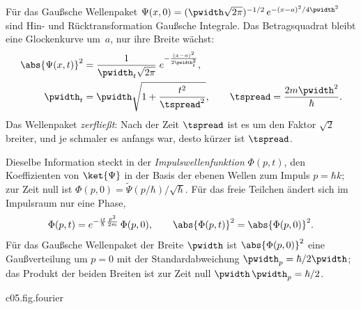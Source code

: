 Für das Gaußsche Wellenpaket
$\Psi(x,0) = (\pwidth\sqrt{2\pi})^{-1/2}\, e^{-(x-a)^2/4\pwidth^2}$ sind Hin- und
Rücktransformation Gaußsche Integrale. Das Betragsquadrat bleibt eine Glockenkurve um~$a$,
nur ihre Breite wächst:
\begin{align}
  \abs{\Psi(x,t)}^2 &= \frac{1}{\pwidth_t\sqrt{2\pi}}\;
  e^{-\frac{(x-a)^2}{2\pwidth_t^2}}, \label{c05.eq.zerfliessen}\\
  \pwidth_t &= \pwidth\sqrt{1+\frac{t^2}{\tspread^2}},
  \qquad
  \tspread = \frac{2m\pwidth^2}{\hbar}. \notag
\end{align}
Das Wellenpaket \emph{zerfließt}: Nach der Zeit $\tspread$ ist es um den Faktor $\sqrt{2}$
breiter, und je schmaler es anfangs war, desto kürzer ist $\tspread$.

Dieselbe Information steckt in der \emph{Impulswellenfunktion} $\Phi(p,t)$, den
Koeffizienten von $\ket{\Psi}$ in der Basis der ebenen Wellen zum Impuls $p = \hbar k$; zur
Zeit null ist $\Phi(p,0) = \widetilde{\Psi}(p/\hbar)/\sqrt{\hbar}$. Für das freie Teilchen ändert sich im
Impulsraum nur eine Phase,
\begin{equation}\label{c05.eq.impulszeit}
  \Phi(p,t) = e^{-\frac{it}{\hbar}\frac{p^2}{2m}}\,\Phi(p,0),
  \qquad
  \abs{\Phi(p,t)}^2 = \abs{\Phi(p,0)}^2 .
\end{equation}
Für das Gaußsche Wellenpaket der Breite $\pwidth$ ist $\abs{\Phi(p,0)}^2$ eine Gaußverteilung
um $p = 0$ mit der Standardabweichung $\pwidth_p = \hbar/2\pwidth$; das Produkt der beiden
Breiten ist zur Zeit null $\pwidth\,\pwidth_p = \hbar/2$.

\begin{tpcfigure}{c05.fig.fourier}
  \caption{Das Gaußsche Wellenpaket zur Zeit $t = 0$, dreimal, mit den Breiten $\pwidth/2$,
    $\pwidth$ und $2\pwidth$, links im Orts-, rechts im Impulsraum; gleiche Linie heißt
    dasselbe Paket. Die Balken über den Kurven markieren $\pm$ eine Standardabweichung:
    Halbiert man die Breite im Ortsraum, so verdoppelt sie sich im Impulsraum. Die Reihenfolge
    der Breiten kehrt sich um, das Produkt bleibt. Mit der Zeit zerfließen die Kurven links nach
    Gleichung~\eqref{c05.eq.zerfliessen}, die rechts bleiben nach
    Gleichung~\eqref{c05.eq.impulszeit} stehen.}
\end{tpcfigure}
